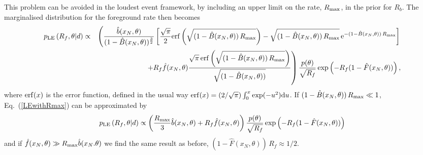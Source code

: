 \documentclass[aps,prd]{revtex4-1}
\begin{document}
This problem can be avoided in the loudest event framework, by
including an upper limit on the rate, $R_{\rm max}$, in the prior for
$R_b$. The marginalised distribution for the foreground rate then
becomes
\begin{eqnarray}
p_{\rm LE}\left( R_f, \theta | d \right) &\propto& \left(
\frac{\hat{b}(x_N,\theta)}{(1-\hat{B}(x_N,\theta))^{\frac{3}{2}}}
\left[\frac{\sqrt{\pi}}{2}{\rm
    erf}\left(\sqrt{(1-\hat{B}(x_N,\theta))\,R_{\rm max}}\right) -
  \sqrt{(1-\hat{B}(x_N,\theta))\,R_{\rm max}} \, {\rm
    e}^{-(1-\hat{B}(x_N,\theta)) \, R_{\rm max}}\right]
\right. \nonumber \\ && \left.+ R_f
\hat{f}(x_N,\theta)\frac{\sqrt{\pi}\,{\rm
    erf}\left(\sqrt{(1-\hat{B}(x_N,\theta))\,R_{\rm
      max}}\right)}{\sqrt{(1-\hat{B}(x_N,\theta))}}\right)\frac{p(\theta)}{\sqrt{R_f}}
\exp\left(-R_f(1-\hat{F}(x_N,\theta))\right) \label{LEwithRmax},
\end{eqnarray}
where ${\rm erf}(x)$ is the error function, defined in the usual way
${\rm erf}(x) = (2/\sqrt{\pi}) \int_0^x \exp(-u^2){\rm d}u$. If
$(1-\hat{B}(x_N,\theta)) \, R_{\rm max} \ll 1$, Eq.~(\ref{LEwithRmax})
can be approximated by
\begin{equation}
p_{\rm LE}\left( R_f, \theta | d \right) \propto \left( \frac{R_{\rm
    max}}{3} \hat{b}(x_N,\theta) + R_f
\hat{f}(x_N,\theta)\right)\frac{p(\theta)}{\sqrt{R_f}}
\exp\left(-R_f(1-\hat{F}(x_N,\theta))\right)
\end{equation}
and if $\hat{f}(x_N,\theta) \gg R_{\rm max} \hat{b}(x_N.\theta)$ we
find the same result as before, $(1- \hat{F}(x_N,\theta))\,R_f \approx
1/2$.
\end{document}
